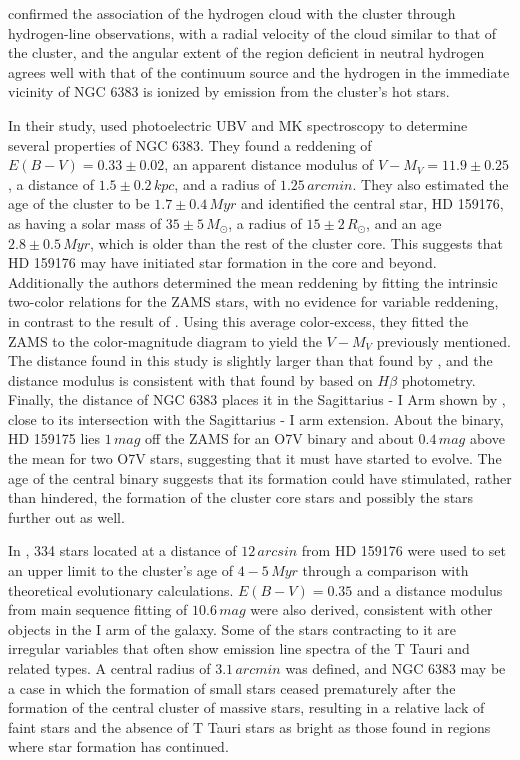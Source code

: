 \documentclass[fleqn,usenatbib,usedcolumn,useAMS]{mnras}
\begin{document}
\citet{1973AuJPh..26..853T} confirmed the association of the hydrogen cloud with the cluster through hydrogen-line observations, with a radial velocity of the cloud similar to that of the cluster, and the angular extent of the region deficient in neutral hydrogen agrees well with that of the continuum source and the hydrogen in the immediate vicinity of NGC 6383 is ionized by emission from the cluster's hot stars.

In their study, \citet{1978MNRAS.182..607F} used photoelectric UBV and MK spectroscopy to determine several properties of NGC 6383. They found a reddening of $E(B-V) = 0.33 \pm 0.02$, an apparent distance modulus of $V-M_V = 11.9 \pm 0.25$, a distance of $1.5 \pm 0.2 \,kpc$, and a radius of $1.25 \,arcmin$. They also estimated the age of the cluster to be $1.7 \pm 0.4\,Myr$ and identified the central star, HD 159176, as having a solar mass of $35 \pm 5\,M_\odot$, a radius of $15 \pm 2\,R_\odot$, and an age $2.8 \pm 0.5\,Myr$, which is older than the rest of the cluster core. This suggests that HD 159176 may have initiated star formation in the core and beyond. Additionally the authors determined the mean reddening by fitting the intrinsic two-color relations for the ZAMS stars, with no evidence for variable reddening, in contrast to the result of \citet{1972BAICz..23..126A}. Using this average color-excess, they fitted the ZAMS to the color-magnitude diagram to yield the $V-M_V$ previously mentioned. The distance found in this study is slightly larger than that found by \citet{1965AJ.....70...19E}, and the distance modulus is consistent with that found by \citet{1967MNRAS.135..377G} based on $H\beta$ photometry. Finally, the distance of NGC 6383 places it in the Sagittarius - I Arm shown by \citet{1975A&A....39..477V}, close to its intersection with the Sagittarius - I arm extension. About the binary, HD 159175 lies $1\,mag$ off the ZAMS for an O7V binary and about $0.4\,mag$ above the mean for two O7V stars, suggesting that it must have started to evolve. The age of the central binary suggests that its formation could have stimulated, rather than hindered, the formation of the cluster core stars and possibly the stars further out as well.

In \citet{1978MNRAS.184..661L}, 334 stars located at a distance of $12\,arcsin$  from HD 159176 were used to set an upper limit to the cluster's age of $4-5\,Myr$ through a comparison with theoretical evolutionary calculations. $E(B-V) = 0.35$ and a distance modulus from main sequence fitting of $10.6\,mag$ were also derived, consistent with other objects in the I arm of the galaxy. Some of the stars contracting to it are irregular variables that often show emission line spectra of the T Tauri and related types. A central radius of $3.1 \,arcmin$ was defined, and NGC 6383 may be a case in which the formation of small stars ceased prematurely after the formation of the central cluster of massive stars, resulting in a relative lack of faint stars and the absence of T Tauri stars as bright as those found in regions where star formation has continued.
\end{document}
